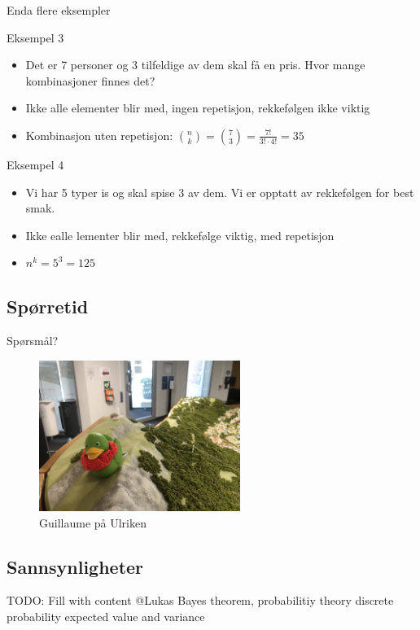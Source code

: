 \begin{frame}{Enda flere eksempler}
\begin{block}{Eksempel 3}
\begin{itemize}
\item Det er 7 personer og 3 tilfeldige av dem skal få en pris. Hvor mange kombinasjoner finnes det?
\item Ikke alle elementer blir med, ingen repetisjon, rekkefølgen ikke viktig 
\item Kombinasjon uten repetisjon: ${n \choose k}={7 \choose 3}=\frac{7!}{3!\cdot 4!}=35$
\end{itemize}
\end{block}

\begin{block}{Eksempel 4}
\begin{itemize}
\item Vi har 5 typer is og skal spise 3 av dem. Vi er opptatt av rekkefølgen for best smak.
\item Ikke ealle lementer blir med, rekkefølge viktig, med repetisjon
\item $n^k=5^3=125$
\end{itemize}
\end{block}
\end{frame}

\subsection*{Spørretid}
\begin{frame}{Spørsmål?}
    \begin{figure}
        \centering
        \includegraphics[height = 4.9cm]{images/guillaume11.jpg}
        \caption{Guillaume på Ulriken}
        \label{fig:guillaume11}
    \end{figure}
\end{frame}

\subsection{Sannsynligheter}
\begin{frame}
TODO: Fill with content @Lukas 
Bayes theorem, probabilitiy theory
discrete probability
expected value and variance
\end{frame}

